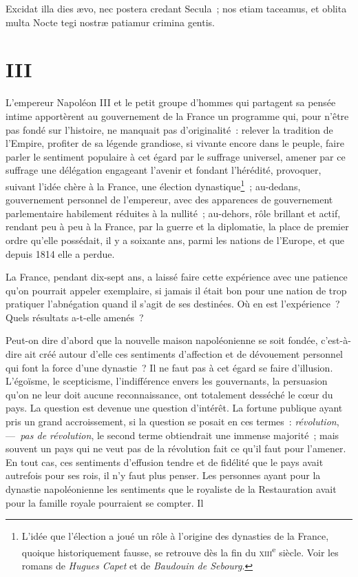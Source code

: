 \documentclass[french,twoside]{book} %
\begin{document}
Excidat illa dies ævo, nec postera credant Secula ; nos etiam taceamus, et oblita multa Nocte tegi nostræ patiamur crimina gentis.
\section[{III}]{III}\renewcommand{\leftmark}{III}

\noindent L’empereur Napoléon III et le petit groupe d’hommes qui partagent sa pensée intime apportèrent au gouvernement de la France un programme qui, pour n’être pas fondé sur l’histoire, ne manquait pas d’originalité : relever la tradition de l’Empire, profiter de sa légende grandiose, si vivante encore dans le peuple, faire parler le sentiment populaire à cet égard par le suffrage universel, amener par ce suffrage une délégation engageant l’avenir et fondant l’hérédité, provoquer, suivant l’idée chère à la France, une élection dynastique\footnote{L’idée que l’élection a joué un rôle à l’origine des dynasties de la France, quoique historiquement fausse, se retrouve dès la fin du \textsc{xiii}\textsuperscript{e} siècle. Voir les romans de {\itshape Hugues Capet} et de {\itshape Baudouin de Sebourg}.} ; au-dedans, gouvernement personnel de l’empereur, avec des apparences de gouvernement parlementaire habilement réduites à la nullité ; au-dehors, rôle brillant et actif, rendant peu à peu à la France, par la guerre et la diplomatie, la place de premier ordre qu’elle possédait, il y a soixante ans, parmi les nations de l’Europe, et que depuis 1814 elle a perdue.\par
La France, pendant dix-sept ans, a laissé faire cette expérience avec une patience qu’on pourrait appeler exemplaire, si jamais il était bon pour une nation de trop pratiquer l’abnégation quand il s’agit de ses destinées. Où en est l’expérience ? Quels résultats a-t-elle amenés ?\par
Peut-on dire d’abord que la nouvelle maison napoléonienne se soit fondée, c’est-à-dire ait créé autour d’elle ces sentiments d’affection et de dévouement personnel qui font la force d’une dynastie ? Il ne faut pas à cet égard se faire d’illusion. L’égoïsme, le scepticisme, l’indifférence envers les gouvernants, la persuasion qu’on ne leur doit aucune reconnaissance, ont totalement desséché le cœur du pays. La question est devenue une question d’intérêt. La fortune publique ayant pris un grand accroissement, si la question se posait en ces termes : {\itshape révolution}, —{\itshape  pas de révolution}, le second terme obtiendrait une immense majorité ; mais souvent un pays qui ne veut pas de la révolution fait ce qu’il faut pour l’amener. En tout cas, ces sentiments d’effusion tendre et de fidélité que le pays avait autrefois pour ses rois, il n’y faut plus penser. Les personnes ayant pour la dynastie napoléonienne les sentiments que le royaliste de la Restauration avait pour la famille royale pourraient se compter. Il
\end{document}
